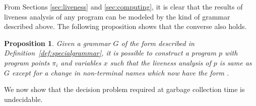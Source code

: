 \documentclass[9pt]{sigplanconf}
\newtheorem{proposition}[theorem]{Proposition}
\begin{document}
From Sections \ref{sec:liveness}  and \ref{sec:computing}, it is clear
that the results of liveness analysis of any program can be modeled by
the kind  of grammar described above. The  following proposition shows
that the converse also holds.
\begin{proposition}
Given    a     grammar    $G$    of    the     form    described    in
Definition~\ref{def:specialgrammar},  it is  possible  to construct  a
program $p$  with program points  $\pi_i$ and variables $x$  such that
the liveness  analysis of $p$  is same as  $G$ except for a  change in
non-terminal names which now have the form .
\end{proposition}
We now show that the decision problem required at garbage collection
time is undecidable.
\newcommand{\state}{\ensuremath{\mathsf{S}}}
\newcommand{\nont}[2]{\ensuremath{\mathsf{S}_{#1}^{#2}}}
\end{document}
